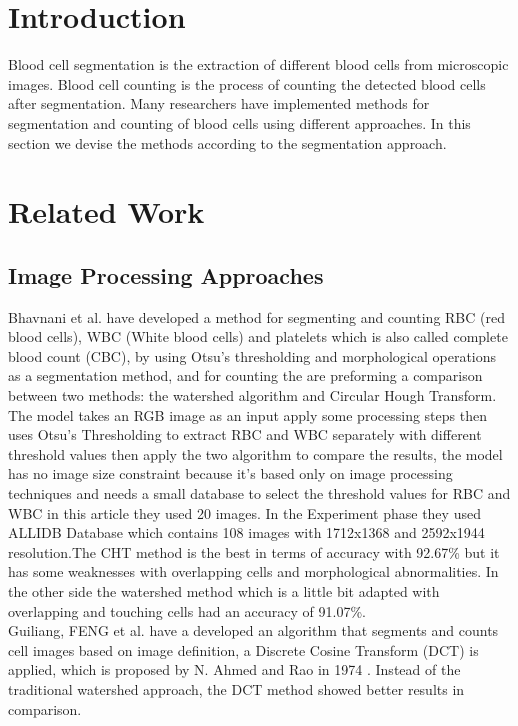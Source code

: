 \section{Introduction}
\vspace{0.2in}
\hspace*{0.16in}

Blood cell segmentation is the extraction of different blood cells from microscopic images. Blood cell counting is the process of counting the detected blood cells after segmentation. Many researchers have implemented methods for segmentation and counting of blood cells using different approaches. In this section we devise the methods according to the segmentation approach.

\section{Related Work}

\subsection{Image Processing Approaches}

Bhavnani et al. \textsuperscript{\cite{bhavnani2016segmentation}} have developed a method for segmenting and counting RBC (red blood cells), WBC (White blood cells) and platelets which is also called complete blood count (CBC), by using Otsu’s thresholding and morphological operations as a segmentation method, and for counting the are preforming a comparison between two methods: the watershed algorithm and Circular Hough Transform. The model takes an RGB image as an input apply some processing steps then uses Otsu's Thresholding to extract RBC and WBC separately with different threshold values then apply the two algorithm to compare the results, the model has no image size constraint because it's based only on image processing techniques and needs a small database to select the threshold values for RBC and WBC in this article they used 20 images. In the Experiment phase they used ALLIDB Database which contains 108 images with 1712x1368 and 2592x1944 resolution.The CHT method is the best in terms of accuracy with 92.67\% but it has some weaknesses with overlapping cells and morphological abnormalities. In the other side the watershed method which is a little bit adapted with overlapping and touching cells had an accuracy of 91.07\%.\\

Guiliang, FENG et al. \textsuperscript{\cite{guiliang2016microscopic}} have a developed an algorithm that segments and counts cell images based on image definition, a Discrete Cosine Transform (DCT) is applied, which is proposed by N. Ahmed and Rao in 1974 \textsuperscript{\cite{ahmed1974discrete}}. Instead of the traditional watershed approach, the DCT method showed better results in comparison.

